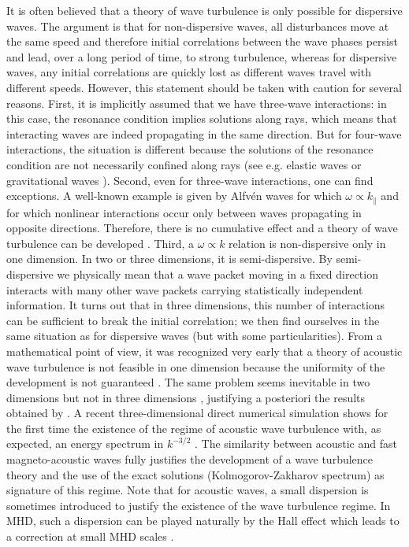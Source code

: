 \documentclass{jpp}
\newcommand{\red}[1]{}
\begin{document}
It is often believed that a theory of wave turbulence is only possible for dispersive waves. The argument is that for non-dispersive waves, all disturbances move at the same speed and therefore initial correlations between the wave phases persist and lead, over a long period of time, to strong turbulence, whereas for dispersive waves, any initial correlations are quickly lost as different waves travel with different speeds. 
However, this statement should be taken with caution for several reasons. 
First, it is implicitly assumed that we have three-wave interactions: in this case, the resonance condition implies solutions along rays, which means that interacting waves are indeed propagating in the same direction. But for four-wave interactions, the situation is different because the solutions of the resonance condition are not necessarily confined along rays (see e.g. elastic waves \citep{Hassaini2019} or gravitational waves \citep{Galtier2017}). 
Second, even for three-wave interactions, one can find exceptions. A well-known example is given by Alfv\'en waves for which $\omega \propto k_\parallel$ and for which nonlinear interactions occur only between waves propagating in opposite directions. Therefore, there is no cumulative effect and a theory of wave turbulence can be developed \citep{Galtier2000}. 
Third, a $\omega \propto k$ relation is non-dispersive only in one dimension. In two or three dimensions, it is semi-dispersive. By semi-dispersive we physically mean that a wave packet moving in a fixed direction interacts with many other wave packets carrying statistically independent information. It turns out that in three dimensions, this number of interactions can be sufficient to break the initial correlation; we then find ourselves in the same situation as for dispersive waves (but with some particularities). 
From a mathematical point of view, it was recognized very early that a theory of acoustic wave turbulence is not feasible in one dimension because the uniformity of the development is not guaranteed \citep{Benney1966}. The same problem seems inevitable in two dimensions but not in three dimensions \citep{Newell1971,Lvov1997}, justifying a posteriori the results obtained by \cite{Zakharov1970}. 
A recent three-dimensional direct numerical simulation shows for the first time the existence of the regime of acoustic wave turbulence with, as expected, an energy spectrum in $k^{-3/2}$ \citep{Kochurin2022}. 
The similarity between acoustic and fast magneto-acoustic waves fully justifies the development of a wave turbulence theory and the use of the exact solutions (Kolmogorov-Zakharov spectrum) as signature of this regime. 
Note that for acoustic waves, a small dispersion is sometimes introduced to justify the existence of the wave turbulence regime. In MHD, such a dispersion can be played naturally by the Hall effect which leads to a correction at small MHD scales \citep{Galtier2006}. \red{In the particular case of three-wave interactions between dispersive kinetic Alfvén waves, an angular distribution of energy is found with a reduction of the cascade along the uniform magnetic field \citep{GaltierCUP2022}.}
\end{document}
